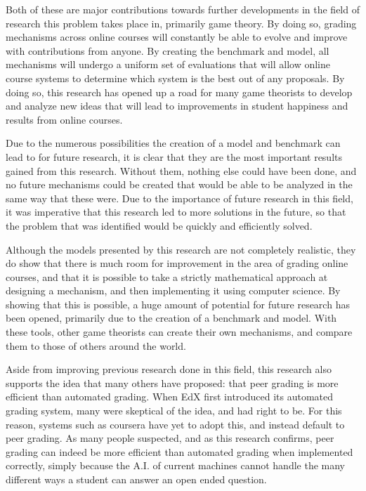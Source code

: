 \documentclass[12pt, Arial]{article}
\begin{document}
Both of these are major contributions towards further developments in the field of research this problem takes place in, primarily game theory. By doing so, grading mechanisms across online courses will constantly be able to evolve and improve with contributions from anyone. By creating the benchmark and model, all mechanisms will undergo a uniform set of evaluations that will allow online course systems to determine which system is the best out of any proposals. By doing so, this research has opened up a road for many game theorists to develop and analyze new ideas that will lead to improvements in student happiness and results from online courses.

Due to the numerous possibilities the creation of a model and benchmark can lead to for future research, it is clear that they are the most important results gained from this research. Without them, nothing else could have been done, and no future mechanisms could be created that would be able to be analyzed in the same way that these were. Due to the importance of future research in this field, it was imperative that this research led to more solutions in the future, so that the problem that was identified would be quickly and efficiently solved.

Although the models presented by this research are not completely realistic, they do show that there is much room for improvement in the area of grading online courses, and that it is possible to take a strictly mathematical approach at designing a mechanism, and then implementing it using computer science. By showing that this is possible, a huge amount of potential for future research has been opened, primarily due to the creation of a benchmark and model. With these tools, other game theorists can create their own mechanisms, and compare them to those of others around the world.

Aside from improving previous research done in this field, this research also supports the idea that many others have proposed: that peer grading is more efficient than automated grading. When EdX first introduced its automated grading system, many were skeptical of the idea, and had right to be. For this reason, systems such as coursera have yet to adopt this, and instead default to peer grading. As many people suspected, and as this research confirms, peer grading can indeed be more efficient than automated grading when implemented correctly, simply because the A.I. of current machines cannot handle the many different ways a student can answer an open ended question.
\end{document}

